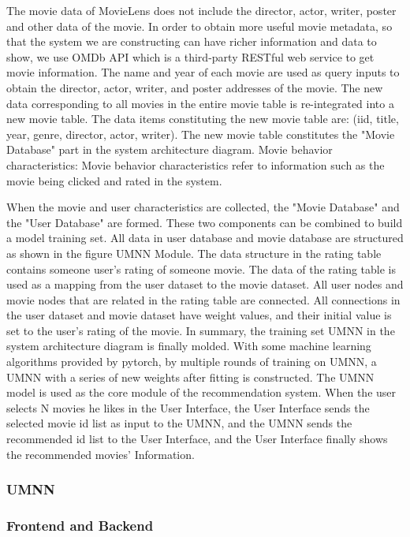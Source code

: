 \par The movie data of MovieLens does not include the director, actor, writer, poster and other data of the movie. In order to obtain more useful movie metadata, so that the system we are constructing can have richer information and data to show, we use OMDb API which is a third-party RESTful web service to get movie information. The name and year of each movie are used as query inputs to obtain the director, actor, writer, and poster addresses of the movie. The new data corresponding to all movies in the entire movie table is re-integrated into a new movie table. The data items constituting the new movie table are: (iid, title, year, genre, director, actor, writer). The new movie table constitutes the "Movie Database" part in the system architecture diagram.
Movie behavior characteristics:
Movie behavior characteristics refer to information such as the movie being clicked and rated in the system.
\par When the movie and user characteristics are collected, the "Movie Database" and the "User Database" are formed. These two components can be combined to build a model training set. All data in user database and movie database are structured as shown in the figure UMNN Module. The data structure in the rating table contains someone user's rating of someone movie. The data of the rating table is used as a mapping from the user dataset to the movie dataset. All user nodes and movie nodes that are related in the rating table are connected. All connections in the user dataset and movie dataset have weight values, and their initial value is set to the user's rating of the movie. In summary, the training set UMNN in the system architecture diagram is finally molded. With some machine learning algorithms provided by pytorch, by multiple rounds of training on UMNN, a UMNN with a series of new weights after fitting is constructed. The UMNN model is used as the core module of the recommendation system. When the user selects N movies he likes in the User Interface, the User Interface sends the selected movie id list as input to the UMNN, and the UMNN sends the recommended id list to the User Interface, and the User Interface finally shows the recommended movies' Information.

\subsubsection{UMNN}
\subsubsection{Frontend and Backend}
